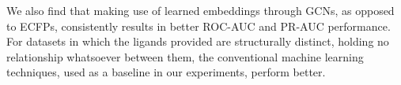 We also find that making use of learned embeddings through GCNs, as opposed to ECFPs, consistently results in better ROC-AUC and PR-AUC performance. For datasets in which the ligands provided are structurally distinct, holding no relationship whatsoever between them, the conventional machine learning techniques, used as a baseline in our experiments, perform better.